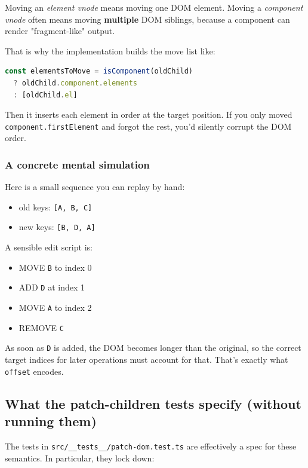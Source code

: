 Moving an \emph{element vnode} means moving one DOM element.
Moving a \emph{component vnode} often means moving \textbf{multiple} DOM siblings, because a component can render "fragment-like" output.

That is why the implementation builds the move list like:

\begin{lstlisting}[language=JavaScript]
const elementsToMove = isComponent(oldChild)
  ? oldChild.component.elements
  : [oldChild.el]
\end{lstlisting}

Then it inserts each element in order at the target position.
If you only moved \texttt{component.firstElement} and forgot the rest, you'd silently corrupt the DOM order.

\subsubsection*{A concrete mental simulation}

Here is a small sequence you can replay by hand:

\begin{itemize}
  \item old keys: \texttt{[A, B, C]}
  \item new keys: \texttt{[B, D, A]}
\end{itemize}

A sensible edit script is:

\begin{itemize}
  \item MOVE \texttt{B} to index 0
  \item ADD \texttt{D} at index 1
  \item MOVE \texttt{A} to index 2
  \item REMOVE \texttt{C}
\end{itemize}

As soon as \texttt{D} is added, the DOM becomes longer than the original, so the correct target indices for later operations must account for that. That's exactly what \texttt{offset} encodes.

\subsection{What the patch-children tests specify (without running them)}

The tests in \texttt{src/\_\_tests\_\_/patch-dom.test.ts} are effectively a spec for these semantics. In particular, they lock down:

